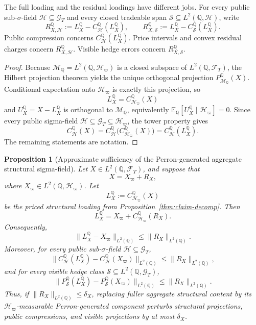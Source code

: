 \documentclass[11pt,a4paper]{amsart}
\theoremstyle{plain}
\newtheorem{proposition}[theorem]{Proposition}
\theoremstyle{definition}
\theoremstyle{remark}
\newcommand{\QQ}{\mathbb{Q}}
\newcommand{\EE}{\mathbb{E}}
\newcommand{\cF}{\mathcal{F}}
\newcommand{\cG}{\mathcal{G}}
\newcommand{\cH}{\mathcal{H}}
\newcommand{\cM}{\mathcal{M}}
\newcommand{\cS}{\mathcal{S}}
\begin{document}
The full loading and the residual loadings have different jobs.  For every public
sub-\(\sigma\)-field \(\cH\subseteq\cG_T\) and every closed tradeable span
\(\cS\subseteq L^2(\QQ,\cH)\), write
\[
        R_{X,\cH}^\QQ
        :=
        L_X^\QQ-C_{\cH}^\QQ(L_X^\QQ),
        \qquad
        R_{X,\cS}^\QQ
        :=
        L_X^\QQ-C_{\cS}^\QQ(L_X^\QQ).
\]
Public compression concerns \(C_{\cH}^\QQ(L_X^\QQ)\).  Price intervals and convex residual
charges concern \(R_{X,\cH}^\QQ\).  Visible hedge errors concern \(R_{X,\cS}^\QQ\).

\begin{proof}
Because \(\cM_\QQ=L^2(\QQ,\cH_\varpi)\) is a closed subspace of \(L^2(\QQ,\cF_T)\), the Hilbert
projection theorem yields the unique orthogonal projection \(P_{\cM_\QQ}^\QQ(X)\).  Conditional
expectation onto \(\cH_\varpi\) is exactly this projection, so
\[
        L_X^\QQ=C_{\cH_\varpi}^\QQ(X)
\]
and \(U_X^\QQ=X-L_X^\QQ\) is orthogonal to \(\cM_\QQ\), equivalently
\(\EE_\QQ[U_X^\QQ\mid \cH_\varpi]=0\).  Since every public sigma-field
\(\cH\subseteq \cG_T\subseteq \cH_\varpi\), the tower property gives
\[
        C_{\cH}^\QQ(X)
        =
        C_{\cH}^\QQ\bigl(C_{\cH_\varpi}^\QQ(X)\bigr)
        =
        C_{\cH}^\QQ(L_X^\QQ).
\]
The remaining statements are notation.
\end{proof}

\begin{proposition}[Approximate sufficiency of the Perron-generated aggregate structural sigma-field]\label{prop:approx-suff}
Let \(X\in L^2(\QQ,\cF_T)\), and suppose that
\[
        X=X_\varpi+R_X,
\]
where \(X_\varpi\in L^2(\QQ,\cH_\varpi)\).  Let
\[
        L_X^\QQ:=C_{\cH_\varpi}^\QQ(X)
\]
be the priced structural loading from Proposition~\ref{thm:claim-decomp}.  Then
\[
        L_X^\QQ
        =
        X_\varpi + C_{\cH_\varpi}^\QQ(R_X).
\]
Consequently,
\[
        \|L_X^\QQ-X_\varpi\|_{L^2(\QQ)}
        \le
        \|R_X\|_{L^2(\QQ)}.
\]
Moreover, for every public sub-\(\sigma\)-field \(\cH\subseteq \cG_T\),
\[
        \|C_{\cH}^\QQ(L_X^\QQ)-C_{\cH}^\QQ(X_\varpi)\|_{L^2(\QQ)}
        \le
        \|R_X\|_{L^2(\QQ)},
\]
and for every visible hedge class \(\cS\subseteq L^2(\QQ,\cG_T)\),
\[
        \|P_{\cS}^\QQ(L_X^\QQ)-P_{\cS}^\QQ(X_\varpi)\|_{L^2(\QQ)}
        \le
        \|R_X\|_{L^2(\QQ)}.
\]
Thus, if \(\|R_X\|_{L^2(\QQ)}\le \delta_X\), replacing fuller aggregate structural content by its
\(\cH_\varpi\)-measurable Perron-generated component perturbs structural projections, public
compressions, and visible projections by at most \(\delta_X\).
\end{proposition}
\end{document}
